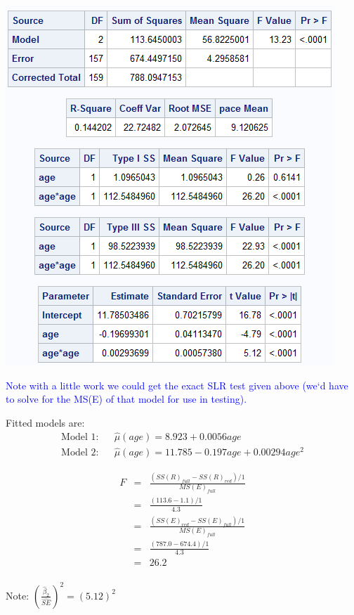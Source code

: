 \begin{flushleft}
\includegraphics[scale=0.8]{resrunquadratic}
\end{flushleft}

\textcolor{blue}{Note with a little work we could get the exact SLR test given above (we`d have to solve for the MS(E) of that model for use in testing).}\newpage

Fitted models are:
\begin{eqnarray*}
\text{Model 1:} & & \hat\mu(age)=8.923 + 0.0056 age\\
\text{Model 2:} & & \hat\mu(age) = 11.785 - 0.197 age + 0.00294 age^2
\end{eqnarray*}

\begin{eqnarray*}
F & = & \frac{(SS(R)_{full}-SS(R)_{red})/1}{MS(E)_{full}} \\
  & = & \frac{(113.6-1.1)/1}{4.3} \\
  & = & \frac{(SS(E)_{red}-SS(E)_{full})/1}{MS(E)_{full}} \\
  & = & \frac{(787.0-674.4)/1}{4.3}\\
  & = & 26.2 \\
\end{eqnarray*}

Note: $\left(\frac{\hat\beta_{ 2}}{\hat{SE}}\right)^2 = (5.12)^2$\\

